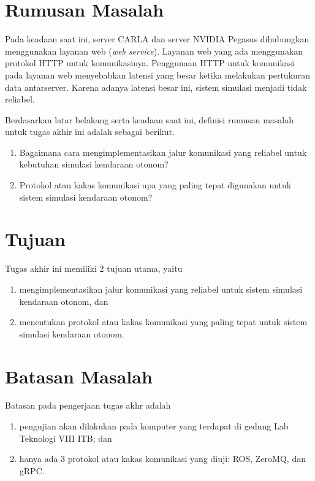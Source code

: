 \section{Rumusan Masalah}

Pada keadaan saat ini, server CARLA dan server NVIDIA Pegasus dihubungkan
menggunakan layanan web (\textit{web service}). Layanan web yang ada menggunakan
protokol HTTP untuk komunikasinya. Penggunaan HTTP untuk komunikasi pada layanan
web menyebabkan latensi yang besar ketika melakukan pertukuran data antarserver.
Karena adanya latensi besar ini, sistem simulasi menjadi tidak reliabel.

Berdasarkan latar belakang serta keadaan saat ini, definisi rumusan masalah
untuk tugas akhir ini adalah sebagai berikut.
\begin{enumerate}
	\item Bagaimana cara mengimplementasikan jalur komunikasi yang reliabel
	      untuk kebutuhan simulasi kendaraan otonom?
	\item Protokol atau kakas komunikasi apa yang paling tepat digunakan untuk
	      sistem simulasi kendaraan otonom?
\end{enumerate}

\section{Tujuan}

Tugas akhir ini memiliki 2 tujuan utama, yaitu
\begin{enumerate}
	\item mengimplementasikan jalur komunikasi yang reliabel untuk sistem
	      simulasi kendaraan otonom, dan
	\item menentukan protokol atau kakas komunikasi yang paling tepat untuk
	      sistem simulasi kendaraan otonom.
\end{enumerate}

\section{Batasan Masalah}

Batasan pada pengerjaan tugas akhr adalah

\begin{enumerate}
	\item pengujian akan dilakukan pada komputer yang terdapat di gedung Lab
	      Tek\-no\-lo\-gi VIII ITB; dan
	\item hanya ada 3 protokol atau kakas komunikasi yang diuji: ROS, ZeroMQ,
	      dan gRPC.
\end{enumerate}

